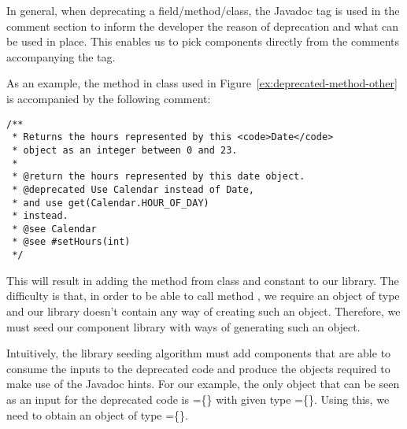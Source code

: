 \documentclass[runningheads,a4paper]{llncs}
\begin{document}
In general, when deprecating a field/method/class, the
 Javadoc tag is used in the comment section to
inform the developer the reason of deprecation and what can be used in
place. This enables us to pick components directly from the comments accompanying the
 tag.


As an example, the  method in class  used in Figure~\ref{ex:deprecated-method-other} is accompanied by the following comment:

\begin{lstlisting}[mathescape=true,showstringspaces=false]
/**
 * Returns the hours represented by this <code>Date</code>
 * object as an integer between 0 and 23.
 *
 * @return the hours represented by this date object.
 * @deprecated Use Calendar instead of Date,
 * and use get(Calendar.HOUR_OF_DAY)
 * instead.
 * @see Calendar
 * @see #setHours(int)
 */  
\end{lstlisting}


This will result in adding the method  from class
 and constant  to our library.
The difficulty is that, in order to be able to call method , we require an object of
type  and our library doesn't contain any way of creating such an object.
Therefore, we must seed our component library with ways of generating such an object.

Intuitively, the library seeding algorithm must add components that are able to consume the
inputs to the deprecated code and produce the objects required to make use
of the Javadoc hints. For our example, the only object that can be seen as an input for the 
deprecated code is =\{\} with given type =\{\}. Using this, we need to obtain an object of type =\{\}.
\end{document}
